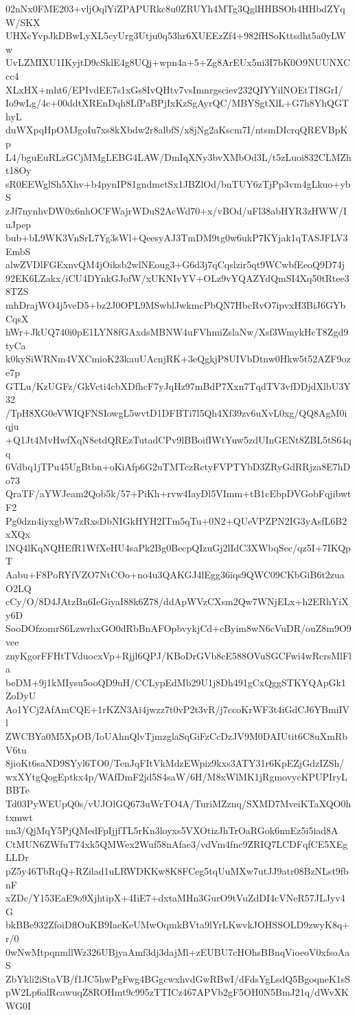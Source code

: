 02nNx0FME203+vljOqlYiZPAPURkc8u0ZRUYh4MTg3QglHHBSOh4HHbdZYqW/SKX
UHXcYvpJkDBwLyXL5cyUrg3Utju0q53hr6XUEEzZf4+982fHSoKttsdht5a0yLWw
UvLZMIXU1IKyjtD9cSklE4g8UQj+wpn4a+5+Zg8ArEUx5ni3I7bK0O9NUUNXCcc4
XLxHX+mht6/EPIvdEE7s1xGs8IvQHtv7vsImnrgsciev232QIYYilNOEtTI8GrI/
Io9wLg/4c+00ddtXREnDqh8LfPaBPjIxKzSgAyrQC/MBYSgtXlL+G7h8YhQGThyL
duWXpqHpOMJgoIu7xs8kXbdw2r8albfS/x8jNg2aKscm7I/ntsmDIcrqQREVBpKp
L4/bguEuRLzGCjMMgLEBG4LAW/DmIqXNy3bvXMbOd3L/t5zLuoi832CLMZht18Oy
sR0EEWglSh5Xhv+b4pynIP81gndmctSx1JBZlOd/bnTUY6zTjPp3vm4gLkuo+ybS
zJf7nynhvDW0x6nhOCFWajrWDuS2AcWd70+x/vBOd/uFl38abHYR3zHWW/IuJpep
bub+bL9WK3VnSrL7Yg3sWl+QeesyAJ3TmDM9tg0w6ukP7KYjak1qTASJFLV3EmbS
alwZVDlFGExnvQM4jOiksb2wlNEoug3+G6d3j7qCqslzir5qt9WCwbfEeoQ9D74j
92EK6LZakx/iCU4DYnkGJofW/xUKNIvYV+OLz9vYQAZYdQmSI4Xq50tRtee38TZS
mhDrajWO4j5veD5+bz2J0OPL9MSwblJwkmcPbQN7HbcRvO7ipvxH3BiJ6GYbCqsX
hWr+JkUQ740i0pE1LYN8fGAxdsMBNW4uFVhmiZslaNw/Xsf3WmykHcT8Zgd9tyCa
k0kySiWRNm4VXCmioK23kauUAcnjRK+3eQgkjP8UIVbDtnw0Hkw5t52AZF9oze7p
GTLu/KzUGFz/GkVcti4cbXDfhcF7yJqHz97mBdP7Xxn7TqdTV3vfDDjdXlbU3Y32
/TpH8XG0eVWIQFNSIowgL5wvtD1DFBTi7l5Qh4Xf39zv6uXvL0xg/QQ8AgM0iqju
+Q1Jt4MvHwfXqN8etdQREzTutadCPv9lBBoifIWtYuw5zdUInGENt8ZBL5tS64qq
6Vdbq1jTPu45UgBtbn+oKiAfp6G2uTMTczRctyFVPTYbD3ZRyGdRRjza8E7hDo73
QraTF/aYWJeam2Qob5k/57+PiKh+rvw4IayDl5VImm+tB1cEbpDVGobFqjibwtF2
Pg0dzn4iyxgbW7zRxsDbNIGkHYH2ITm5qTu+0N2+QUeVPZPN2IG3yAsfL6B2xXQx
lNQ4lKqNQHEfR1WfXeHU4saPk2Bg0BecpQIzuGj2lIdC3XWbqSec/qz5I+7IKQpT
Aabu+F8PoRYfVZO7NtCOo+no4u3QAKGJ4lEgg36iqs9QWC09CKbGiB6t2zuaO2LQ
cCy/O/8D4JAtzBn6IeGiyaI88k6Z78/ddApWVzCXsm2Qw7WNjELx+h2ERhYiXy6D
SooDOfzomrS6LzwrhxGO0dRbBnAFOpbvykjCd+cByim8wN6cVuDR/ouZ8m9O9vee
znyKgorFFHtTVduocxVp+Rjjl6QPJ/KBoDrGVb8cE588OVuSGCFwi4wRcrsMlFla
beDM+9j1kMIysu5ooQD9uH/CCLypEdMb29U1j8Dh491gCxQggSTKYQApGk1ZoDyU
Ao1YCj2AfAmCQE+1rKZN3Ai4jwzz7t0vP2t3vR/j7ccoKrWF3t4iGdCJ6YBmiIVl
ZWCBYa0M5XpOB/IoUAhnQlvTjmzglaSqGiFzCcDzJV9M0DAIUtit6C8uXmRbV6tu
8jioKt6saND9SYyl6TO0/TenJqFItVkMdzEWpiz9kxs3ATY31r6KpEZjGdzIZSh/
wxXYtgQogEptkx4p/WAfDmF2jd5S4saW/6H/M8xWlMK1jRgmovycKPUPIryLBBTe
Td03PyWEUpQ0s/vUJOlGQ673uWrTO4A/TuriMZznq/SXMD7MveiKTaXQO0htxmwt
nn3/QjMqY5PjQMedFpIjjfTL5rKn3loyxs5VXOtizJhTrOaRGok6nnEz5i5iad8A
CtMUN6ZWfuT74xk5QMWex2Wuf58nAfae3/vdVm4fnc9ZRIQ7LCDFqfCE5XEgLLDr
pZ5y46TbRqQ+RZilad1uLRWDKKw8K8FCeg5tqUuMXw7utJJ9atr08BzNLst9fbnF
xZDc/Y153EaE9o9XjhtipX+4IiE7+dxtaMHn3GurO9tVuZdDI4cVNeR57JLJyv4G
bkBBe932ZfoiDflOuKB9IaeKeUMwOqmkBVta9lYrLKwvkJOHSSOLD9zwyK8q+r/0
0wNwMtpqnmllWz326UBjyaAmf3dj3dajMl+zEUBU7cHOhsBBnqVioeoV0xfsoAaS
ZbYkli2iStaVB/f1JC5hwPgFwg4BGgcwxhvdGwRBwI/dFdsYgLsdQ5BgoqneK1sS
pW2Lp6alRcawuqZ8ROHmt9c995zTTICz467APVb2gF5OH0N5BmJ21q/dWvXKWG0I
